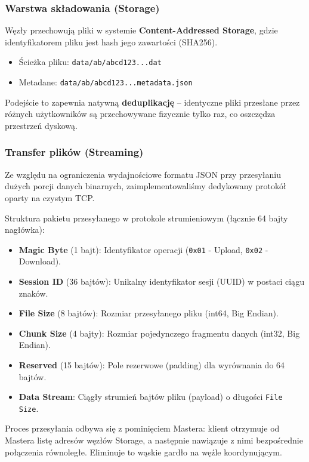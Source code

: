 \documentclass[12pt,a4paper]{article}
\begin{document}
	\subsubsection{Warstwa składowania (Storage)}
	Węzły przechowują pliki w systemie \textbf{Content-Addressed Storage}, gdzie identyfikatorem pliku jest hash jego zawartości (SHA256).
	\begin{itemize}
		\item Ścieżka pliku: \texttt{data/ab/abcd123...dat}
		\item Metadane: \texttt{data/ab/abcd123...metadata.json}
	\end{itemize}
	Podejście to zapewnia natywną \textbf{deduplikację} – identyczne pliki przesłane przez różnych użytkowników są przechowywane fizycznie tylko raz, co oszczędza przestrzeń dyskową.

	\subsubsection{Transfer plików (Streaming)}
	Ze względu na ograniczenia wydajnościowe formatu JSON przy przesyłaniu dużych porcji danych binarnych, zaimplementowaliśmy dedykowany protokół oparty na czystym TCP.
	
	Struktura pakietu przesyłanego w protokole strumieniowym (łącznie 64 bajty nagłówka):
	\begin{itemize}
		\item \textbf{Magic Byte} (1 bajt): Identyfikator operacji (\texttt{0x01} - Upload, \texttt{0x02} - Download).
		\item \textbf{Session ID} (36 bajtów): Unikalny identyfikator sesji (UUID) w postaci ciągu znaków.
		\item \textbf{File Size} (8 bajtów): Rozmiar przesyłanego pliku (int64, Big Endian).
		\item \textbf{Chunk Size} (4 bajty): Rozmiar pojedynczego fragmentu danych (int32, Big Endian).
		\item \textbf{Reserved} (15 bajtów): Pole rezerwowe (padding) dla wyrównania do 64 bajtów.
		\item \textbf{Data Stream}: Ciągły strumień bajtów pliku (payload) o długości \texttt{File Size}.
	\end{itemize}

	Proces przesyłania odbywa się z pominięciem Mastera: klient otrzymuje od Mastera listę adresów węzłów Storage, a następnie nawiązuje z nimi bezpośrednie połączenia równoległe. Eliminuje to wąskie gardło na węźle koordynującym.
\end{document}
